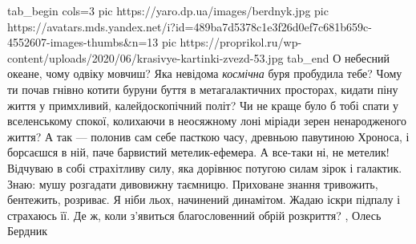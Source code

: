 \ifcmt
  tab_begin cols=3
     pic https://yaro.dp.ua/images/berdnyk.jpg
     pic https://avatars.mds.yandex.net/i?id=489ba7d5378c1e3f26d0ef7c681b659c-4552607-images-thumbs&n=13
		 pic https://proprikol.ru/wp-content/uploads/2020/06/krasivye-kartinki-zvezd-53.jpg
  tab_end
\fi
О небесний океане, чому одвіку мовчиш? Яка невідома \emph{космічна} буря пробудила
тебе? Чому ти почав гнівно котити буруни буття в метагалактичних просторах,
кидати піну життя у примхливий, калейдоскопічний політ? Чи не краще було б тобі
спати у вселенському спокої, колихаючи в неосяжному лоні міріади зерен
ненародженого життя? А так — полонив сам себе пасткою часу, древньою павутиною
Хроноса, і борсаєшся в ній, паче барвистий метелик-ефемера. А все-таки ні, не
метелик! Відчуваю в собі страхітливу силу, яка дорівнює потугою силам зірок і
галактик. Знаю: мушу розгадати дивовижну таємницю. Приховане знання тривожить,
бентежить, розриває. Я ніби льох, начинений динамітом. Жадаю іскри підпалу і
страхаюсь її. Де ж, коли з’явиться благословенний обрій розкриття?
, Олесь Бердник

